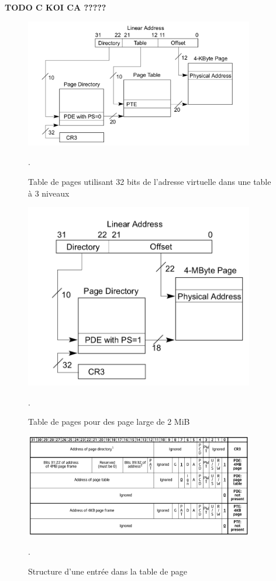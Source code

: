 \textbf{TODO C KOI CA ?????}
\begin{figure}[H]
    \center
    \includegraphics[width=10cm]{images/memory_page_table_32bits.png}
    \caption{\label{pic:memory_page_table_32bits} Table de pages utilisant 32 bits de l'adresse virtuelle dans une table à 3 niveaux \cite{intel64and}}.
\end{figure}

\begin{figure}
    \center
    \includegraphics[width=10cm]{images/memory_page_table_32bits_large.png}
    \caption{\label{pic:memory_page_table_32bits_large} Table de pages pour des page large de 2 MiB\cite{intel64and}}.
\end{figure}


\begin{figure}
    \center
    \includegraphics[width=10cm]{images/memory_page_table_entry_intel.png}
    \caption{\label{pic:memory_page_table_entry_intel} Structure d'une entrée dans la table de page \cite{intel64and}}.
\end{figure}


